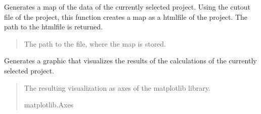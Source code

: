 \documentclass[letterpaper,10pt,english]{sphinxmanual}
\begin{document}
\begin{fulllineitems}
\begin{fulllineitems}
\label{\detokenize{apidoc/src.osm_configurator.control:src.osm_configurator.control.control_interface.IControl.generate_cut_out_map}}
\pysigstartsignatures
{}
\pysigstopsignatures
\sphinxAtStartPar
Generates a map of the data of the currently selected project.
Using the cut\sphinxhyphen{}out file of the project, this function creates a map as a html\sphinxhyphen{}file of the project. The path to the html\sphinxhyphen{}file is returned.
\begin{quote}\begin{description}
\sphinxAtStartPar
The path to the file, where the map is stored.

\sphinxAtStartPar
{}

\end{description}\end{quote}

\end{fulllineitems}


\begin{fulllineitems}
\label{\detokenize{apidoc/src.osm_configurator.control:src.osm_configurator.control.control_interface.IControl.get_calculation_visualization}}
\pysigstartsignatures
{}
\pysigstopsignatures
\sphinxAtStartPar
Generates a graphic that visualizes the results of the calculations of the currently selected project.
\begin{quote}\begin{description}
\sphinxAtStartPar
The resulting visualization as axes of the matplotlib library.

\sphinxAtStartPar
matplotlib.Axes

\end{description}\end{quote}

\end{fulllineitems}


\end{fulllineitems}
\end{document}
